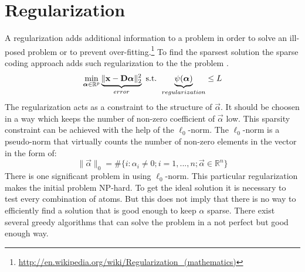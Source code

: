 \section{Regularization}
A regularization adds additional information to a problem in order to solve an
ill-posed problem or to prevent over-fitting.\footnote{\url{
http://en.wikipedia.org/wiki/Regularization_(mathematics)}}
To find the sparsest solution the sparse coding approach adds such
regularization to the the problem . 
\begin{equation}
\min_{\boldsymbol{\mathrm{\alpha}}\in\mathbb{R}^{p}}
\underbrace{\lVert \boldsymbol{\mathrm{x}} -
\boldsymbol{\mathrm{D}}\boldsymbol{\mathrm{\alpha}}\rVert^{2}_{2}}_{error} \text{ s.t. }
\underbrace{\psi(\boldsymbol{\mathrm{\alpha}})}_{regularization}\leq L \label{eq:problem2}
\end{equation}
The regularization acts as a constraint to the structure of $\vec{\alpha}$. It
should be choosen in a way which keeps the number of non-zero coefficient of
$\vec{\alpha}$ low. 
This sparsity constraint can be achieved with the help of
the $\ell_0$-norm. The $\ell_0$-norm is a pseudo-norm that virtually counts the
number of non-zero elements in the vector in the form of:
\begin{equation*}
\lVert \vec{\alpha} \rVert_{0} = \#\{i:\alpha_i \neq 
0; i=1,...,n; \vec{\alpha}\in\mathbb{R}^n\} 
\end{equation*}
There is one significant problem in using $\ell_0$-norm. This particular
regularization makes the initial problem  NP-hard. To get
the ideal solution it is necessary to test every combination of atoms. But this
does not imply that there is no way to efficiently find a solution that is good
enough to keep $\alpha$ sparse. There exist several greedy algorithms that can
solve the problem in a not perfect but good enough way. 

